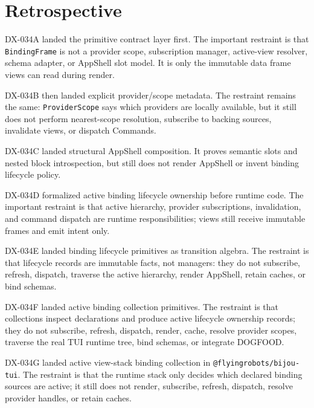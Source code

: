 \section{Retrospective}\label{record-132-retrospective}

DX-034A landed the primitive contract layer first. The important restraint is that \texttt{B\allowbreak{}i\allowbreak{}n\allowbreak{}d\allowbreak{}i\allowbreak{}n\allowbreak{}g\allowbreak{}F\allowbreak{}r\allowbreak{}a\allowbreak{}m\allowbreak{}e} is not a provider scope, subscription manager, active-view resolver, schema adapter, or AppShell slot model. It is only the immutable data frame views can read during render.

DX-034B then landed explicit provider/scope metadata. The restraint remains the same: \texttt{P\allowbreak{}r\allowbreak{}o\allowbreak{}v\allowbreak{}i\allowbreak{}d\allowbreak{}e\allowbreak{}r\allowbreak{}S\allowbreak{}c\allowbreak{}o\allowbreak{}p\allowbreak{}e} says which providers are locally available, but it still does not perform nearest-scope resolution, subscribe to backing sources, invalidate views, or dispatch Commands.

DX-034C landed structural AppShell composition. It proves semantic slots and nested block introspection, but still does not render AppShell or invent binding lifecycle policy.

DX-034D formalized active binding lifecycle ownership before runtime code. The important restraint is that active hierarchy, provider subscriptions, invalidation, and command dispatch are runtime responsibilities; views still receive immutable frames and emit intent only.

DX-034E landed binding lifecycle primitives as transition algebra. The restraint is that lifecycle records are immutable facts, not managers: they do not subscribe, refresh, dispatch, traverse the active hierarchy, render AppShell, retain caches, or bind schemas.

DX-034F landed active binding collection primitives. The restraint is that collections inspect declarations and produce active lifecycle ownership records; they do not subscribe, refresh, dispatch, render, cache, resolve provider scopes, traverse the real TUI runtime tree, bind schemas, or integrate DOGFOOD.

DX-034G landed active view-stack binding collection in \texttt{@\allowbreak{}f\allowbreak{}l\allowbreak{}y\allowbreak{}i\allowbreak{}n\allowbreak{}g\allowbreak{}r\allowbreak{}o\allowbreak{}b\allowbreak{}o\allowbreak{}t\allowbreak{}s\allowbreak{}/\allowbreak{}b\allowbreak{}i\allowbreak{}j\allowbreak{}o\allowbreak{}u\allowbreak{}-\allowbreak{}t\allowbreak{}u\allowbreak{}i}. The restraint is that the runtime stack only decides which declared binding sources are active; it still does not render, subscribe, refresh, dispatch, resolve provider handles, or retain caches.

